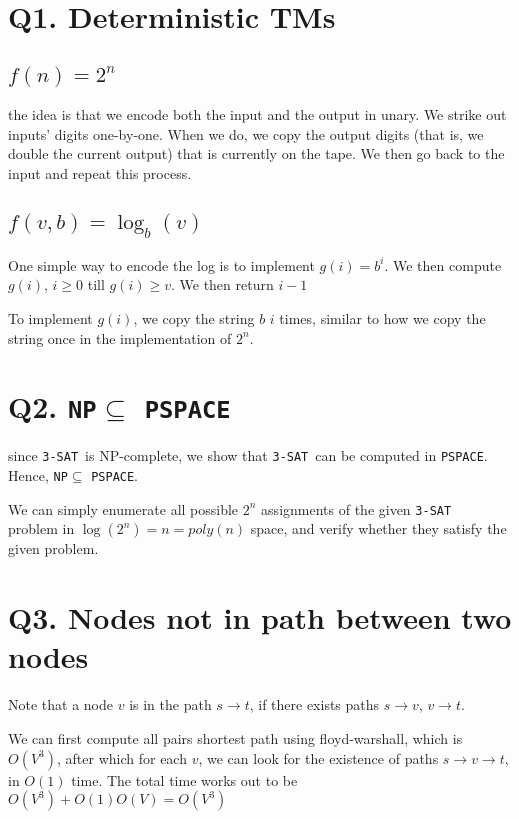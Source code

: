 \documentclass{article}
\begin{document}
\newcommand{\threesat}{\texttt{3-SAT}~}
\newcommand{\pspace}{\texttt{PSPACE}}
\newcommand{\np}{\texttt{NP}}
\section{Q1. Deterministic TMs}

\subsection{$f(n) = 2^n$}

the idea is that we encode both the input and the output in unary. We strike
out inputs' digits one-by-one. When we do, we copy the output digits (that is,
we double the current output) that is currently on the tape. We then go back to
the input and repeat this process.


\subsection{$f(v, b) = \log_b(v)$}

One simple way to encode the log is to  implement $g(i) = b^i$. We then 
compute $g(i)$, $i \geq 0$ till $g(i) \geq v$. We then return $i - 1$

To implement $g(i)$, we copy the string $b$ $i$ times, similar to how we copy the
string once in the implementation of $2^n$.

\section{Q2. \np $\subseteq$ \pspace}
since \threesat is NP-complete, we show that \threesat can be computed in
\pspace. Hence, \np $\subseteq$ \pspace.

We can simply enumerate all possible $2^n$ assignments of the given \threesat
problem in $\log(2^n) = n = poly(n)$ space, and verify whether they satisfy
the given problem.

\section{Q3. Nodes not in path between two nodes}

Note that a node $v$ is in the path $s \rightarrow t$, if there exists paths
$s \rightarrow v$, $v \rightarrow t$.

We can first compute all pairs shortest path using floyd-warshall, which is 
$O(V^3)$, after which for each $v$, we can look for the existence of paths
$s \rightarrow v \rightarrow t$, in $O(1)$ time. The total time works out to be 
$O(V^3) + O(1)O(V) = O(V^3)$
\end{document}
